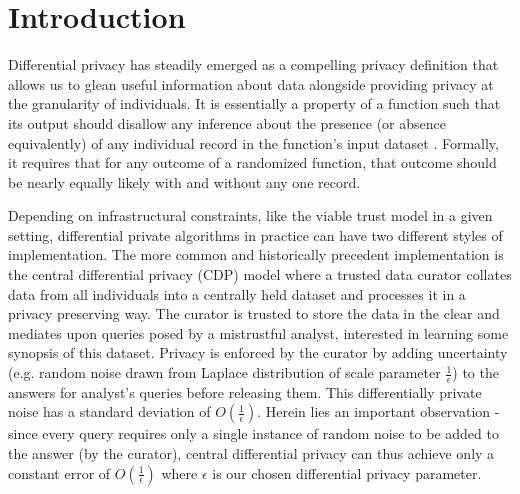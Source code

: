 \section{Introduction}
Differential privacy has steadily emerged as a compelling privacy definition that allows us to glean useful information about data alongside providing privacy at the granularity of individuals. %
It is essentially a property of a function such that its output  should disallow any inference about the
 presence (or absence equivalently) of any individual record in the function's input dataset \cite{dwork}. 
Formally, it requires that for any outcome of a randomized function, that outcome should be nearly equally likely with and without any one record. \par
Depending on infrastructural constraints, like the viable trust model in a given setting, differential private algorithms in practice can have two different styles of implementation.  The more common and historically precedent implementation is the central differential privacy (\textsf{CDP}) model where a trusted data curator collates data from all individuals into a centrally held dataset and processes it in a privacy preserving way. %
 The curator is trusted to store the data in the clear and mediates upon queries posed by a mistrustful analyst, interested in learning some synopsis of this dataset. Privacy is enforced by the curator by adding uncertainty (e.g. random noise drawn from Laplace distribution of scale parameter $\frac{1}{\epsilon}$) to the answers for analyst's queries before releasing them.  This differentially private noise has a standard deviation of $O(\frac{1}{\epsilon})$. Herein lies an important observation - since every query requires only a single instance of random noise to be added to the answer (by the curator), central differential privacy can thus achieve only a constant error of $O(\frac{1}{\epsilon})$ where $\epsilon$ is our chosen differential privacy parameter. 
